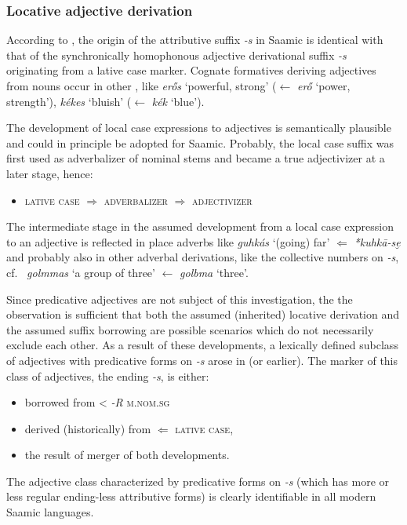 {\subsubsection{Locative adjective derivation}
According to \citet[96]{bergsland1946}, the origin of the attributive suffix \textit{-s} in Saamic is identical with that of the synchronically homophonous adjective derivational suffix \textit{-s} originating from a lative case marker. Cognate formatives deriving adjectives from nouns occur in other , like  \textit{erős} ‘powerful, strong’ ($\leftarrow$ \textit{erő} ‘power, strength’), \textit{kékes} ‘bluish’ ($\leftarrow$ \textit{kék} ‘blue’).

The development of local case expressions to adjectives is semantically plausible and could in principle be adopted for Saamic. Probably, the local case suffix was first used as adverbalizer of nominal stems and became a true adjectivizer at a later stage, hence:
\begin{itemize}
\item \textsc{lative case} $\Rightarrow$ \textsc{adverbalizer} $\Rightarrow$ \textsc{adjectivizer}
\end{itemize}
The intermediate stage in the assumed development from a local case expression to an adjective is reflected in place adverbs like  \textit{guhkás} ‘(going) far’ $\Leftarrow$  \textit{*kuhkā-se̮} \cite[246]{sammallahti1998b} and probably also in other adverbal derivations, like the collective numbers on \textit{-s}, cf.~ \textit{golmmas} ‘a group of three’ $\leftarrow$ \textit{golbma} ‘three’.

Since predicative adjectives are not subject of this investigation, the the observation is sufficient that both the assumed (inherited) locative derivation and the assumed suffix borrowing are possible scenarios which do not necessarily exclude each other. As a result of these developments, a lexically defined subclass of adjectives with predicative forms on \textit{-s} arose in  (or earlier). The marker of this class of adjectives, the ending \textit{-s}, is either:
\begin{itemize}
\item borrowed from <  \textit{-R} \textsc{m.nom.sg}
\item derived (historically) from $\Leftarrow$ \textsc{lative case}, %
\item the result of merger of both developments.
\end{itemize}
\noindent The adjective class characterized by predicative forms on \textit{-s} (which has more or less regular ending-less attributive forms) is clearly identifiable in all modern Saamic languages.

}
